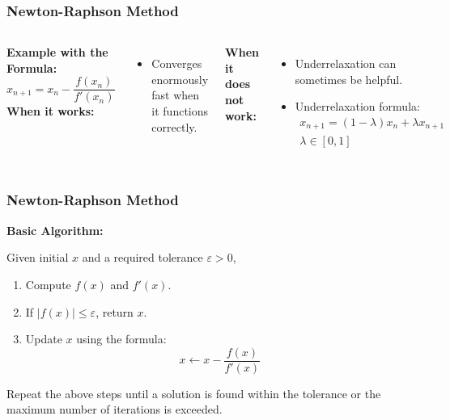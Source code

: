 \begin{frame}[fragile]
    \frametitle{Newton-Raphson Method}
    \vspace{-0.4cm}
    \begin{columns}
    \textbf{Example with the Formula:}
      \[
      x_{n+1} = x_n - \frac{f(x_n)}{f'(x_n)}
      \]
    \textbf{When it works:}
    \begin{itemize}
        \item Converges enormously fast when it functions correctly.
    \end{itemize}
    
    \textbf{When it does not work:}
    \begin{itemize}
        \item Underrelaxation can sometimes be helpful.
        \item Underrelaxation formula:
        \begin{align*}
        x_{n+1} = (1-\lambda)x_n + \lambda x_{n+1}\\
        \lambda \in [0,1]  
        \end{align*}
    \end{itemize}
    
    
   \end{columns}
\end{frame}


\begin{frame}[fragile]
    \frametitle{Newton-Raphson Method}
    \textbf{Basic Algorithm:}

    Given initial \( x \) and a required tolerance \( \varepsilon > 0 \),
    \begin{enumerate}
        \item Compute \( f(x) \) and \( f'(x) \).
        \item If \( |f(x)| \leq \varepsilon \), return \( x \).
        \item Update \( x \) using the formula:
        \[
        x \leftarrow x - \frac{f(x)}{f'(x)}
        \]
    \end{enumerate}
    Repeat the above steps until a solution is found within the tolerance or the maximum number of iterations is exceeded.
\end{frame}

